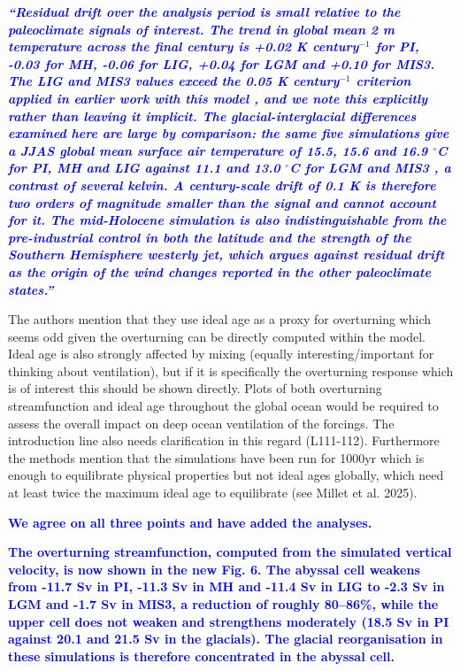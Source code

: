 \documentclass[pdflatex,sn-nature]{sn-jnl}
\begin{document}
\medskip
\noindent\textcolor{blue}{\textbf{\textit{``Residual drift over the analysis period is small relative to the paleoclimate signals of interest. The trend in global mean 2 m temperature across the final century is +0.02 K century$^{-1}$ for PI, -0.03 for MH, -0.06 for LIG, +0.04 for LGM and +0.10 for MIS3. The LIG and MIS3 values exceed the 0.05 K century$^{-1}$ criterion applied in earlier work with this model , and we note this explicitly rather than leaving it implicit. The glacial-interglacial differences examined here are large by comparison: the same five simulations give a JJAS global mean surface air temperature of 15.5, 15.6 and 16.9 $^\circ$C for PI, MH and LIG against 11.1 and 13.0 $^\circ$C for LGM and MIS3 , a contrast of several kelvin. A century-scale drift of 0.1 K is therefore two orders of magnitude smaller than the signal and cannot account for it. The mid-Holocene simulation is also indistinguishable from the pre-industrial control in both the latitude and the strength of the Southern Hemisphere westerly jet, which argues against residual drift as the origin of the wind changes reported in the other paleoclimate states.''}}}
\medskip

\medskip
\noindent The authors mention that they use ideal age as a proxy for overturning which seems odd given the overturning can be directly computed within the model. Ideal age is also strongly affected by mixing (equally interesting/important for thinking about ventilation), but if it is specifically the overturning response which is of interest this should be shown directly. Plots of both overturning streamfunction and ideal age throughout the global ocean would be required to assess the overall impact on deep ocean ventilation of the forcings. The introduction line also needs clarification in this regard (L111-112). Furthermore the methods mention that the simulations have been run for 1000yr which is enough to equilibrate physical properties but not ideal ages globally, which need at least twice the maximum ideal age to equilibrate (see Millet et al. 2025).
\medskip

\noindent\textcolor{blue}{\textbf{We agree on all three points and have added the analyses.}}


\noindent\textcolor{blue}{\textbf{The overturning streamfunction, computed from the simulated vertical velocity, is now shown in the new Fig. 6. The abyssal cell weakens from -11.7 Sv in PI, -11.3 Sv in MH and -11.4 Sv in LIG to -2.3 Sv in LGM and -1.7 Sv in MIS3, a reduction of roughly 80--86\%, while the upper cell does not weaken and strengthens moderately (18.5 Sv in PI against 20.1 and 21.5 Sv in the glacials). The glacial reorganisation in these simulations is therefore concentrated in the abyssal cell.}}
\end{document}
